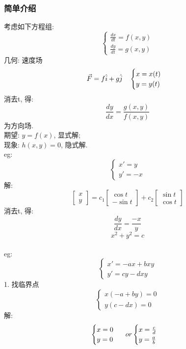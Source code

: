 \subsubsection{\large 简单介绍}
考虑如下方程组:
\[
\begin{cases}
    \frac{dx}{dt} = f(x,y) \\
    \frac{dy}{dt} = g(x,y)
\end{cases}
\]
几何: 速度场
\[ \vec{F} = f\hat{i} + g\hat{j} 
\hspace*{1em}
\begin{cases}
    x = x(t) \\
    y = y(t)
\end{cases}
\]
消去t, 得:
\[
\frac{dy}{dx} = \frac{g(x,y)}{f(x,y)}
\]
为方向场.\\
期望: $y=f(x)$, 显式解;\\
现象: $h(x,y) = 0$, 隐式解.\\
eg:
\[
\begin{cases}
    x' = y \\
    y' = -x
\end{cases}
\]
解:
\[
\begin{bmatrix}
    x \\
    y
\end{bmatrix} = c_1
\begin{bmatrix}
    \cos t \\
    -\sin t
\end{bmatrix} + c_2
\begin{bmatrix}
    \sin t \\
    \cos t
\end{bmatrix}
\]
消去t, 得:
\[
\frac{dy}{dx} = \frac{-x}{y}
\] 
\[ x^2 + y^2 = c \]\\[0.5em]
eg:
\[
\begin{cases}
    x' = -ax + bxy \\
    y' = cy - dxy
\end{cases}
\]
1. 找临界点
\[
\begin{cases}
    x(-a + by) = 0 \\
    y(c - dx) = 0
\end{cases}
\]
解:
\[
\begin{cases}
    x = 0 \\
    y = 0 
\end{cases}
\hspace*{0.5em} or 
\begin{cases}
    x = \frac{c}{d} \\
    y = \frac{a}{b}
\end{cases}
\]
